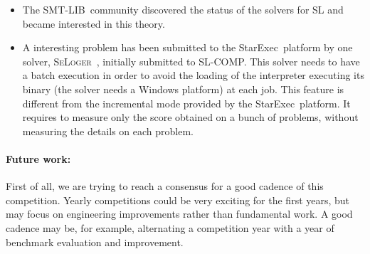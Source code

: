 \documentclass[twoside,11pt]{article}
\newcommand{\smtlib}{\textsf{SMT-LIB}}
\newcommand{\slcomp}{\textsf{SL-COMP}}
\newcommand{\starexec}{\textsf{StarExec}}
\begin{document}
\begin{itemize}
\item The \smtlib\ community discovered the status of the solvers for SL and became interested in this theory.

\item A interesting problem has been submitted to the \starexec\ platform by one solver, \textsc{SeLoger}~\cite{HasseIOP13}, initially submitted to \slcomp. 
This solver needs to have a batch execution in order to avoid the loading of the interpreter executing its binary (the solver needs a Windows platform) at each job.
This feature is different from the incremental mode provided by the \starexec\ platform. 
It requires to measure only the score obtained on a bunch of problems, without measuring the details on each problem. 

\end{itemize}


\paragraph{Future work:}
First of all, we are trying to reach a consensus for a good cadence of this competition. Yearly competitions could be very exciting for the first years, but may focus on engineering improvements rather than fundamental work. 
A good cadence may be, for example, alternating a competition year with a year of benchmark evaluation and improvement.
\end{document}
